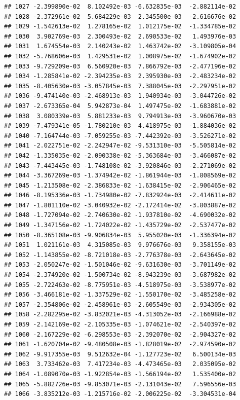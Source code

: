 \documentclass[
]{article}
\begin{document}
\begin{verbatim}
## 1027 -2.399890e-02  8.102492e-03 -6.632835e-03  -2.882114e-02
## 1028 -2.372961e-02  5.684229e-03  2.345500e-03  -2.616676e-02
## 1029 -1.542613e-02  1.278165e-02  1.012175e-02  -1.334785e-02
## 1030  3.902769e-03  2.300493e-02  2.690533e-02   1.493976e-03
## 1031  1.674554e-03  2.140243e-02  1.463742e-02  -3.109805e-04
## 1032 -5.768606e-03  1.429531e-02  1.008975e-02  -1.674902e-02
## 1033 -9.729209e-03  6.560920e-03  7.866792e-03  -2.477196e-02
## 1034 -1.285841e-02 -2.394235e-03  2.395930e-03  -2.483234e-02
## 1035 -8.405630e-03 -3.057845e-03  7.388045e-03  -2.297951e-02
## 1036 -9.474140e-03 -2.468913e-03  1.940934e-03  -3.044726e-02
## 1037 -2.673365e-04  5.942873e-04  1.497475e-02  -1.683881e-02
## 1038  3.080339e-03  5.881233e-03  9.794913e-03  -3.960670e-03
## 1039 -7.479341e-05 -1.780210e-03  4.418975e-03  -1.884036e-02
## 1040 -7.164744e-03 -7.059255e-03 -7.442392e-03  -3.526271e-02
## 1041 -2.022751e-02 -2.242947e-02 -9.531310e-03  -5.505814e-02
## 1042 -1.335035e-02 -2.090338e-02 -5.363684e-03  -3.466087e-02
## 1043 -7.443445e-03 -1.748108e-02 -3.920846e-03  -2.271069e-02
## 1044 -3.367269e-03 -1.374942e-02 -1.861944e-03  -1.808569e-02
## 1045 -1.213508e-02 -2.386833e-02 -1.638415e-02  -2.906465e-02
## 1046 -8.195336e-03 -1.734980e-02 -7.832924e-03  -2.414611e-02
## 1047 -1.801110e-02 -3.040932e-02 -2.172414e-02  -3.803887e-02
## 1048 -1.727094e-02 -2.740630e-02 -1.937810e-02  -4.690032e-02
## 1049 -1.347156e-02 -1.724022e-02 -1.435729e-02  -2.537477e-02
## 1050 -8.365108e-03 -9.906834e-03  5.955020e-03  -1.336394e-02
## 1051  1.021161e-03  4.315085e-03  9.976676e-03   9.358155e-03
## 1052 -1.143855e-02 -8.721018e-03 -2.776378e-03  -2.643645e-02
## 1053 -2.050247e-02 -1.501046e-02 -9.631630e-03  -3.701149e-02
## 1054 -2.374920e-02 -1.500734e-02 -8.943239e-03  -3.687982e-02
## 1055 -2.722463e-02 -8.775951e-03 -4.518975e-03  -3.538977e-02
## 1056 -3.466181e-02 -1.337529e-02 -1.550170e-02  -3.485258e-02
## 1057 -2.354806e-02 -2.458961e-03 -2.605549e-03  -2.934305e-02
## 1058 -2.282295e-02 -3.832021e-03 -4.313052e-03  -2.166988e-02
## 1059 -2.142169e-02 -2.105335e-03 -1.074621e-02  -2.540397e-02
## 1060 -2.167229e-02 -6.298553e-03 -2.392070e-02  -2.904327e-02
## 1061 -1.620704e-02 -9.480508e-03 -1.828019e-02  -2.974590e-02
## 1062 -9.917355e-03  9.512632e-04 -1.127723e-02   6.500134e-03
## 1063  3.733462e-03  7.417234e-03 -4.473465e-03   2.035095e-02
## 1064 -1.089070e-03 -1.922854e-03 -1.566194e-02   1.535400e-02
## 1065 -5.882726e-03 -9.853071e-03 -2.131043e-02   7.596556e-03
## 1066 -3.835212e-03 -1.215716e-02 -2.006225e-02  -3.304531e-04

\end{verbatim}
\end{document}
